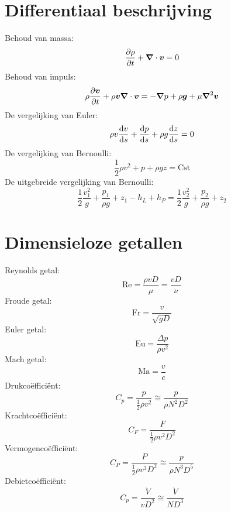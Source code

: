 	\section{Differentiaal beschrijving}
\begin{multicols}{2}
	Behoud van massa:
	\begin{equation}
		\frac{\partial \rho}{\partial t} + \boldsymbol{\nabla} \cdot \boldsymbol{v} = 0
	\end{equation}
	Behoud van impuls:
	\begin{equation}
		\rho \frac{\partial \boldsymbol{v}}{\partial t} + \rho \boldsymbol{v} \boldsymbol{\nabla} \cdot \boldsymbol{v} = -\boldsymbol{\nabla} p + \rho \boldsymbol{g} + \mu \boldsymbol{\nabla}^2 \boldsymbol{v}
	\end{equation}
	De vergelijking van Euler:
	\begin{equation}
		\rho v \frac{\mathrm{d} v}{\mathrm{d} s} + \frac{\mathrm{d} p}{\mathrm{d} s} + \rho g \frac{\mathrm{d} z}{\mathrm{d} s} = 0
	\end{equation}
	De vergelijking van Bernoulli:
	\begin{equation}
		\frac{1}{2} \rho  v^2 + p + \rho g z = \text{Cst}
	\end{equation}
	De uitgebreide vergelijking van Bernoulli:
	\begin{equation}
		\frac{1}{2} \frac{v_1^2}{g} + \frac{p_1}{\rho g} + z_1 - h_L + h_P = \frac{1}{2} \frac{v_2^2}{g} + \frac{p_2}{\rho g} + z_2
	\end{equation}
\end{multicols}

	\section{Dimensieloze getallen}
\begin{multicols}{2}
	Reynolds getal:
	\begin{equation}
		\text{Re} = \frac{\rho v D}{\mu} = \frac{v D}{\nu}
	\end{equation}
	Froude getal:
	\begin{equation}
		\text{Fr} = \frac{v}{\sqrt{g D}}
	\end{equation}
	Euler getal:
	\begin{equation}
		\text{Eu} = \frac{\Delta p}{\rho v^2}
	\end{equation}
	Mach getal:
	\begin{equation}
		\text{Ma} = \frac{v}{c}
	\end{equation}
	Drukco\"effici\"ent:
	\begin{equation}
		C_p = \frac{p}{\frac{1}{2}\rho v^2} \cong \frac{p}{\rho N^2 D^2}
	\end{equation}
	Krachtco\"effici\"ent:
	\begin{equation}
		C_F = \frac{F}{\frac{1}{2}\rho v^2 D^2}
	\end{equation}
	Vermogenco\"effici\"ent:
	\begin{equation}
		C_P = \frac{P}{\frac{1}{2}\rho v^3 D^2} \cong \frac{p}{\rho N^3 D^5}
	\end{equation}
	Debietco\"effici\"ent:
	\begin{equation}
		C_p = \frac{\dot{V}}{v D^2} \cong \frac{\dot{V}}{N D^3}
	\end{equation}
\end{multicols}

